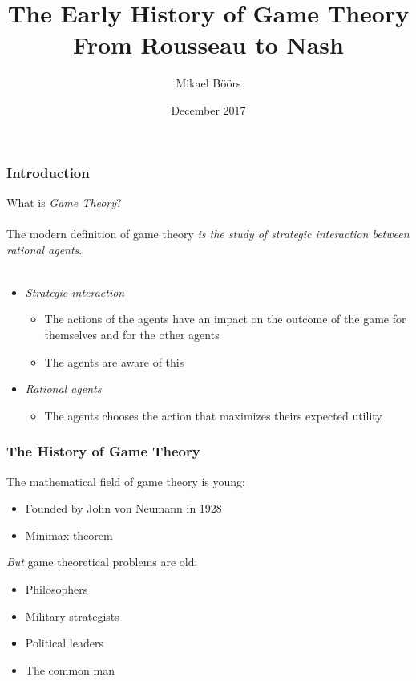 \documentclass{beamer}
\title{The Early History of Game Theory\\
  From Rousseau to Nash}
\author{Mikael Böörs}
\institute{University of Gothenburg}
\date{December 2017}
\begin{document}
 
\frame{\titlepage}

\begin{frame}
\frametitle{Introduction}

What is \emph{Game Theory}?\\~\\

The modern definition of game theory \emph{is
the study of strategic interaction between rational agents}.\\~\\

\begin{itemize}
\item \emph{Strategic interaction}
  \begin{itemize}
    \item The actions of the agents have an impact on the outcome of
      the game for themselves and for the other agents
    \item The agents are aware of this
  \end{itemize}
\item \emph{Rational agents}
    \begin{itemize}
    \item The agents chooses the action that maximizes theirs expected utility
  \end{itemize}
\end{itemize}

 \end{frame}


\begin{frame}
\frametitle{The History of Game Theory}

The mathematical field of game theory is young:

\begin{itemize}
\item Founded by John von Neumann in 1928
  \item Minimax theorem
\end{itemize}

\emph{But} game theoretical problems are old:

\begin{itemize}
\item Philosophers
\item Military strategists
\item Political leaders
\item The common man
\end{itemize}

\end{frame}
\end{document}
